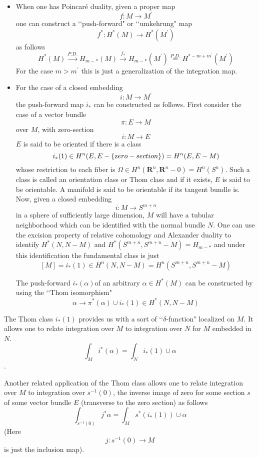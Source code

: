 \documentclass[a4paper,a4paper]{article}
\theoremstyle{conjecture}
\begin{document}
\begin {itemize}
\item When one has Poincar\'e duality, given a proper map
$$f:M\rightarrow M^\prime$$
one can construct a \lq\lq push-forward" or \lq\lq umkehrung" map
$$f^*:H^*(M)\longrightarrow H^*(M^\prime)$$
as follows
$$H^*(M)\stackrel{P.D.}\longrightarrow
H_{m-*}(M)\stackrel{f_*}\longrightarrow H_{m-*}(M^\prime)\stackrel{P.D.}
=H^{*-m+m^\prime}(M^\prime)$$
For the case $m > m^\prime$ this is just a generalization of the integration map.

\item For the case of a closed embedding 
$$i:M\rightarrow M^\prime$$
the push-forward map $i_*$ can be constructed as follows.  First consider the case
of a vector bundle 
$$\pi:E\rightarrow M$$
over $M$, with zero-section
$$i:M\rightarrow E$$
$E$ is said to be oriented if there is a class 
$$i_*(1)\in H^n(E, E-\{{\text zero-section}\})= H^n(E,E-M)$$
whose restriction to each fiber is
$\Omega\in H^n(\mathbf R^n,\mathbf R^n-0)=H^n(S^n)$.  Such a class
is called an orientation class or Thom class and if it exists, $E$ is
said to be orientable.  A manifold is said to be orientable if its
tangent bundle is. Now, given a closed embedding                                    
$$i:M\longrightarrow S^{m+n}$$
in a sphere of sufficiently large dimension, $M$ will have a
tubular neighborhood which can be identified with the normal
bundle $N$. One can use the excision
property of relative cohomology and Alexander duality to identify
$H^*(N,N-M)$ and $H^*(S^{m+n},S^{m+n}-M)=H_{m-*}$
and under this identification the fundamental class is just
$$[M]=i_*(1)\in  H^{n}(N,N-M)=H^n(S^{m+n},S^{m+n}-M)$$

The push-forward $i_*(\alpha)$of an arbitrary $\alpha\in H^*(M)$ can be constructed by using
the \lq\lq Thom isomorphism"
$$\alpha\rightarrow \pi^*(\alpha)\cup i_*(1) \in H^*(N,N-M)$$
\end{itemize}


The Thom
class $i_*(1)$ provides us with a sort of \lq\lq $\delta$-function" localized on $M$.
It allows one to relate integration over $M$ to integration over $N$ for $M$ embedded in $N$.
$$\int_M i^*(\alpha)=\int_N i_*(1)\cup \alpha$$.  

Another related application of the Thom class allows one to relate integration over $M$ to
integration over $s^{-1}(0)$, the inverse image of zero for some section $s$ of some vector 
bundle $E$ (transverse to the zero section) as follows
$$\int_{s^{-1}(0)}j^*\alpha=\int_M s^*(i_*(1))\cup \alpha$$
(Here $$j:s^{-1}(0)\rightarrow M$$
is just the inclusion map).
\end{document}

